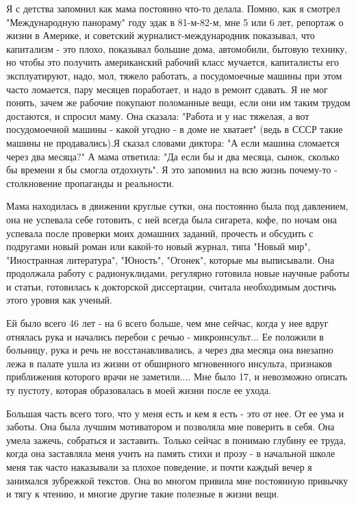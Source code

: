 Я с детства запомнил как мама постоянно что-то делала. Помню, как я смотрел
"Международную панораму" году эдак в  81-м-82-м, мне 5 или 6 лет,  репортаж о
жизни в Америке, и советский журналист-международник показывал, что капитализм
- это плохо, показывал большие дома, автомобили, бытовую технику, но чтобы это
получить американский рабочий класс мучается, капиталисты его эксплуатируют,
надо, мол,  тяжело работать, а посудомоечные машины при этом часто ломается,
пару месяцев поработает, и надо в ремонт сдавать. Я не мог понять, зачем же
рабочие покупают поломанные вещи, если они им таким трудом достаются, и спросил
маму. Она сказала: "Работа и у нас тяжелая, а вот посудомоечной машины - какой
угодно - в доме не хватает" (ведь в СССР такие машины не продавались).Я сказал
словами диктора: "А если машина сломается через два месяца?" А мама ответила:
"Да если бы и два месяца, сынок, сколько бы времени я бы смогла отдохнуть".  Я
это запомнил на всю жизнь почему-то - столкновение пропаганды и реальности.

Мама находилась в движении круглые сутки, она постоянно была под давлением, она
не успевала себе готовить, с ней всегда была сигарета, кофе, по ночам она
успевала после проверки моих домашних заданий, прочесть и обсудить с подругами
новый роман или какой-то новый журнал, типа "Новый мир", "Иностранная
литература", "Юность", "Огонек", которые мы выписывали. Она продолжала работу с
радионуклидами, регулярно готовила новые научные  работы и статьи, готовилась к
докторской диссертации, считала необходимым достичь этого уровня как ученый. 

Ей было всего 46 лет - на 6 всего больше, чем мне сейчас, когда у нее вдруг
отнялась рука и начались перебои с речью - микроинсульт... Ее положили в
больницу, рука и речь не восстанавливались, а через два месяца она внезапно
лежа в палате ушла из жизни от обширного мгновенного инсульта, признаков
приближения которого врачи не заметили.... Мне было 17, и невозможно описать ту
пустоту, которая образовалась в моей жизни после ее ухода. 

Большая часть всего того, что у меня есть и кем я есть - это от нее. От ее ума
и заботы. Она была лучшим мотиватором и позволяла мне поверить в себя. Она
умела зажечь, собраться и заставить. Только сейчас в понимаю глубину ее труда,
когда она заставляла меня учить на память стихи и прозу - в начальной школе
меня так часто наказывали за плохое поведение, и почти каждый вечер  я
занимался зубрежкой текстов. Она во многом привила мне постоянную привычку и
тягу к чтению, и многие другие такие полезные в жизни вещи. 


